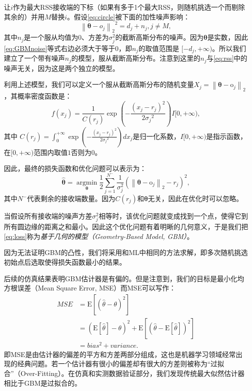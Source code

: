 让$i$作为最大RSS接收端的下标（如果有多于1个最大RSS，则随机挑选一个而剔除其余的）并用$M$替换$i$。假设\eqref{eq:circle}被下面的加性噪声影响：
\begin{equation}
{\left\| {\bm{\theta}  - o_j} \right\|_2}^2 = d_j + n_j, j \neq M, \label{eq:GBMnoise}
\end{equation}
其中$n_j$是一个服从均值为$0$、方差为$\sigma_j^2$的截断高斯分布的噪声。因为$\bm{\theta}$是实数，因此\eqref{eq:GBMnoise}等式右边必须大于等于$0$，即$n_j$的取值范围是 $[-d_j, +\infty)$。所以我们建立了一个带有噪声$n_j$的模型，服从截断高斯分布。注意到这里的$n_j$与\eqref{eq:rss}中的噪声无关，因为这是两个独立的模型。

利用上述模型，我们可以定义一个服从截断高斯分布的随机变量$X_j = \left\|{\bm\theta} - \bm{\mathrm{o}}_j\right\|_2$，其概率密度函数是：
\begin{equation}
f(x_j) = \frac{1}{C(r_j)}\exp(-\frac{(x_j - r_j)^2}{2{\sigma_j}^2})I[0, +\infty), \label{eq:pdf}
\end{equation}
其中 $C(r_j) = \int_0^{ + \infty }\exp(-\frac{(x_j - r_j)^2}{2{\sigma_j}^2})dx_j$是归一化系数，$I[0, +\infty)$是指示函数，在$[0, +\infty)$范围内取值$1$否则为$0$。

因此，最终的损失函数和优化问题可以表示为：
\begin{equation}
\widehat {\bm{\theta }} = \mathop {\arg \min }\limits_{\bm{\theta }} \frac{1}{2}\sum\limits_{j = 1}^{N^-} {\frac{1}{\sigma_j^2}(\left\|{\bm\theta} - \bm{\mathrm{o}}_j\right\|_2 - r_j)^2}, \label{eq:loss}
\end{equation}
其中$N^-$代表剩余的接收端数量。因为$C(r_j)$和$\bm\theta$无关，因此在优化时可以忽略。

当假设所有接收端的噪声方差$\sigma_j^2$相等时，该优化问题就变成找到一个点，使得它到所有圆边缘的距离之和最小。因此这个优化问题有着明晰的几何意义，于是我们把\eqref{eq:loss}称为\textit{基于几何的模型（Geometry-Based Model, GBM）}。

因为无法证明GBM的凸性，我们将采用和ML中相同的方法求解，即多次随机挑选初始点后选取使得损失函数最小的结果。

后续的仿真结果表明GBM估计器是有偏的。但是注意到，我们的目标是最小化均方根误差（Mean Square Error, MSE）而MSE可以写作：
\begin{equation}    \label{eq:mse}
\begin{split}
MSE &= \mathrm{E}[(\widehat{\theta} - \theta)^2]\\
&= (\mathrm{E}[\widehat{\theta}] - \theta)^2 + \mathrm{E}[(\widehat{\theta} - \mathrm{E}[\widehat{\theta}])^2]\\
&= bias^2 + variance.
\end{split}
\end{equation}
即MSE是由估计器的偏差的平方和方差两部分组成，这也是机器学习领域经常出现的经典问题。若一个估计器有很小的偏差却有很大的方差则被称为“过拟合”（Over-Fitting）。在仿真和实测数据验证部分，我们发现传统最大似然估计器相比于GBM是过拟合的。

